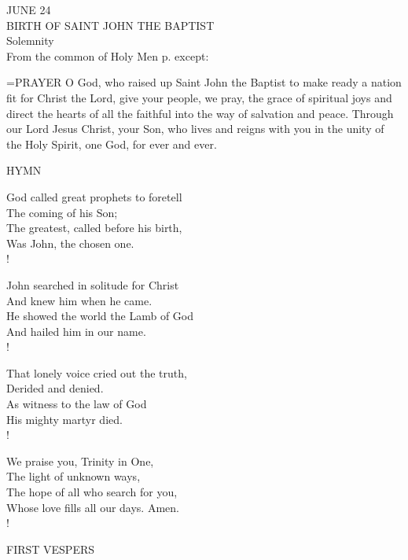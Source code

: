 \begin{center}\normalsize JUNE 24\\
\footnotesize BIRTH OF SAINT JOHN THE BAPTIST\\
\footnotesize Solemnity\\
\footnotesize From the common of Holy Men p.     except:\\
\end{center}

\hangindent=\parindent \small{PRAYER 
O God, who raised up Saint John the Baptist
to make ready a nation fit for Christ the Lord,
give your people, we pray,
the grace of spiritual joys
and direct the hearts of all the faithful
into the way of salvation and peace.
Through our Lord Jesus Christ, your Son,
who lives and reigns with you in the unity of the Holy Spirit,
one God, for ever and ever.\\}
 
\noindent\small{\uppercase{Hymn}}\normalsize\label{proper:johnthebaptist:hymn}
\begin{cverse}
God called great prophets to foretell\\
The coming of his Son;\\
The greatest, called before his birth,\\
Was John, the chosen one.\\!

John searched in solitude for Christ\\
And knew him when he came.\\
He showed the world the Lamb of God\\
And hailed him in our name.\\!

That lonely voice cried out the truth,\\
Derided and denied.\\
As witness to the law of God\\
His mighty martyr died.\\!

We praise you, Trinity in One,\\
The light of unknown ways,\\
The hope of all who search for you,\\
Whose love fills all our days. Amen.\\!
\end{cverse}

\begin{flushleft}\normalsize FIRST VESPERS\\\end{flushleft}

